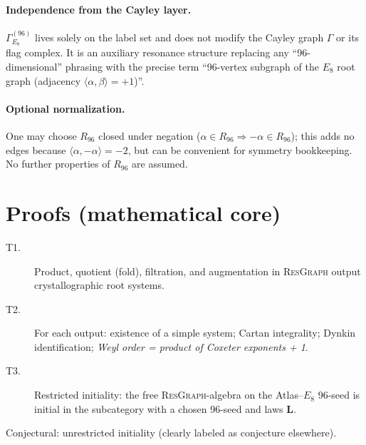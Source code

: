\documentclass[12pt]{article}
\begin{document}
\paragraph{Independence from the Cayley layer.} $\Gamma_{E_8}^{(96)}$ lives solely on the label set and does not modify the Cayley graph $\Gamma$ or its flag complex. It is an auxiliary resonance structure replacing any ``96-dimensional'' phrasing with the precise term ``96-vertex subgraph of the $E_8$ root graph (adjacency $\langle\alpha,\beta\rangle=+1$)''.

\paragraph{Optional normalization.} One may choose $R_{96}$ closed under negation ($\alpha\in R_{96}\Rightarrow-\alpha\in R_{96}$); this adds no edges because $\langle\alpha,-\alpha\rangle=-2$, but can be convenient for symmetry bookkeeping. No further properties of $R_{96}$ are assumed.

\section{Proofs (mathematical core)}
\begin{description}
  \item[T1.] Product, quotient (fold), filtration, and augmentation in \textsc{ResGraph} output crystallographic root systems.
  \item[T2.] For each output: existence of a simple system; Cartan integrality; Dynkin identification; \emph{Weyl order = product of Coxeter exponents + 1}.
  \item[T3.] Restricted initiality: the free \textsc{ResGraph}-algebra on the Atlas--$E_8$ 96-seed is initial in the subcategory with a chosen 96-seed and laws $\mathbf L$.
\end{description}
Conjectural: unrestricted initiality (clearly labeled as conjecture elsewhere).

\end{document}

